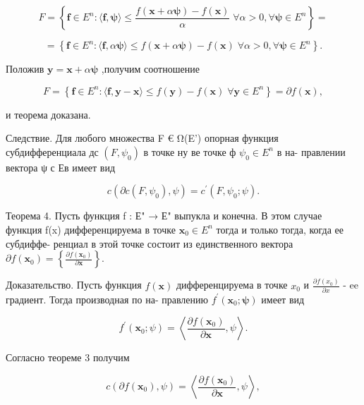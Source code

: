 \documentclass[8pt]{extarticle}
\begin{document}
\[
F = \left\{  {\mathbf{f} \in  {E}^{n} : \langle \mathbf{f},\mathbf{\psi }\rangle  \leq  \frac{f\left( {\mathbf{x} + \alpha \mathbf{\psi }}\right)  - f\left( \mathbf{x}\right) }{\alpha }\;\forall \alpha  > 0,\forall \mathbf{\psi } \in  {E}^{n}}\right\}   =
\]

\[
= \left\{  {\mathbf{f} \in  {E}^{n} : \langle \mathbf{f},\alpha \mathbf{\psi }\rangle  \leq  f\left( {\mathbf{x} + \alpha \mathbf{\psi }}\right)  - f\left( \mathbf{x}\right) \;\forall \alpha  > 0,\forall \mathbf{\psi } \in  {E}^{n}}\right\}  .
\]

Положив \(\mathbf{y} = \mathbf{x} + \alpha \mathbf{\psi }\) ,получим соотношение

\[
F = \left\{  {\mathbf{f} \in  {E}^{n} : \langle \mathbf{f},\mathbf{y} - \mathbf{x}\rangle  \leq  f\left( \mathbf{y}\right)  - f\left( \mathbf{x}\right) \;\forall \mathbf{y} \in  {E}^{n}}\right\}   = \partial f\left( \mathbf{x}\right) ,
\]

и теорема доказана.

Следствие. Для любого множества F € Ω(E’) опорная функция субдифференциала дс \(\left( {F,{\psi }_{0}}\right)\) в точке ну ве точке ф \({\psi }_{0} \in  {E}^{n}\) в на- правлении вектора ψ с Ев имеет вид

\[
c\left( {\partial c\left( {F,{\psi }_{0}}\right) ,\psi }\right)  = {c}^{\prime }\left( {F,{\psi }_{0};\psi }\right) .
\]

Теорема 4. Пусть функция f : Е" → Е" выпукла и конечна. В этом случае функция f(x) дифференцируема в точке \({\mathbf{x}}_{0} \in  {E}^{n}\) тогда и только тогда, когда ее субдиффе- ренциал в этой точке состоит из единственного вектора \(\partial f\left( {\mathbf{x}}_{0}\right)  = \left\{  \frac{\partial f\left( {\mathbf{x}}_{0}\right) }{\partial \mathbf{x}}\right\}  .\)

Доказательство. Пусть функция \(f\left( \mathbf{x}\right)\) дифференцируема в точке \({x}_{0}\) и \(\frac{\partial f\left( {x}_{0}\right) }{\partial x}\) - ee градиент. Тогда производная по на- правлению \({f}^{\prime }\left( {{\mathbf{x}}_{0};\mathbf{\psi }}\right)\) имеет вид

\[
{f}^{\prime }\left( {{\mathbf{x}}_{0};\psi }\right)  = \left\langle  {\frac{\partial f\left( {\mathbf{x}}_{0}\right) }{\partial \mathbf{x}},\psi }\right\rangle  .
\]

Согласно теореме 3 получим

\[
c\left( {\partial f\left( {\mathbf{x}}_{0}\right) ,\psi }\right)  = \left\langle  {\frac{\partial f\left( {\mathbf{x}}_{0}\right) }{\partial \mathbf{x}},\psi }\right\rangle  ,
\]
\end{document}

